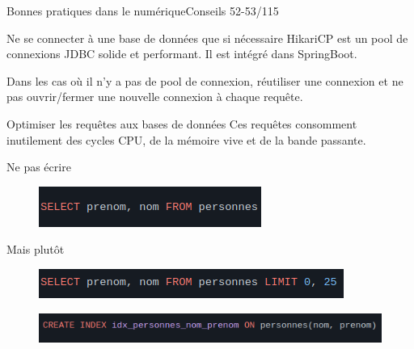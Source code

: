 \begin{frame}{Bonnes pratiques dans le numérique}{Conseils 52-53/115}
\begin{block}{Ne se connecter à une base de données que si nécessaire}
HikariCP est un pool de connexions JDBC solide et performant. Il est intégré dans SpringBoot.

Dans les cas où il n'y a pas de pool de connexion, réutiliser une connexion et ne pas ouvrir/fermer une nouvelle connexion à chaque requête.
\end{block}

\begin{block}{Optimiser les requêtes aux bases de données}
 Ces requêtes consomment inutilement des cycles CPU, de la mémoire vive et de la bande passante.

\end{block}

\begin{minipage}[b]{0.5\linewidth}
\begin{alertblock}{Ne pas écrire}
\begin{figure}
    \includegraphics[scale=0.4]{chapitre2/wdd5/fig/c2.png}
    \centering
\end{figure}
 \end{alertblock}
\end{minipage}\hfill
\begin{minipage}[b]{0.5\linewidth}
\begin{exampleblock}{Mais plutôt}
\begin{figure}
    \includegraphics[scale=0.4]{chapitre2/wdd5/fig/c3.png}
    \centering
\end{figure}
 \end{exampleblock}
\end{minipage}\hfill

\begin{figure}
    \centering
    \includegraphics[scale=0.4]{chapitre2/wdd5/fig/c4.png}
\end{figure}
\end{frame}



